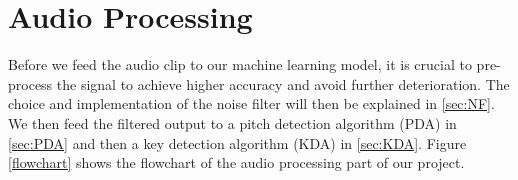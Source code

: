\chapter{Audio Processing} %

\label{Chapter5} %
Before we feed the audio clip to our machine learning model, it is crucial to pre-process the signal to achieve higher accuracy
and avoid further deterioration.
The choice and implementation of the noise filter will then be explained in \autoref{sec:NF}. We then feed the filtered output 
to a pitch detection algorithm (PDA) in \autoref{sec:PDA} and then a key detection algorithm (KDA) in \autoref{sec:KDA}.
Figure \ref{flowchart} shows the flowchart of the audio processing part of our project.


